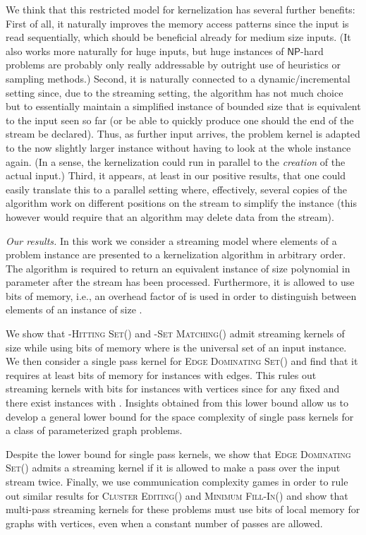\documentclass[draft,a4paper]{llncs}
\newcommand{\NP}{\ensuremath{\mathsf{NP}}\xspace}
\newcommand{\dHSk}{-\textsc{Hitting Set()}\xspace}
\newcommand{\dSMk}{-\textsc{Set Matching()}\xspace}
\newcommand{\EDSk}{\textsc{Edge Dominating Set()}\xspace}
\newcommand{\CEk}{\textsc{Cluster Editing()}\xspace}
\newcommand{\MFIk}{\textsc{Minimum Fill-In()}\xspace}
\begin{document}
We think that this restricted model for kernelization has several further benefits: First of all, it naturally improves the memory access patterns since the input is read sequentially, which should be beneficial already for medium size inputs. (It also works more naturally for huge inputs, but huge instances of \NP-hard problems are probably only really addressable by outright use of heuristics or sampling methods.) Second, it is naturally connected to a dynamic/incremental setting since, due to the streaming setting, the algorithm has not much choice but to essentially maintain a simplified instance of bounded size that is equivalent to the input seen so far (or be able to quickly produce one should the end of the stream be declared). Thus, as further input arrives, the problem kernel is adapted to the now slightly larger instance without having to look at the whole instance again. (In a sense, the kernelization could run in parallel to the \emph{creation} of the 
actual input.) Third, it 
appears, at least in our positive results, that one could easily translate this to a parallel setting where, effectively, several copies of the algorithm work on different positions on the stream to simplify the instance (this however would require that an algorithm may delete data from the stream).

\emph{Our results.}
In this work we consider a streaming model where elements of a problem instance are presented to a kernelization algorithm in arbitrary order. The algorithm is required to return an equivalent instance of size polynomial in parameter  after the stream has been processed. Furthermore, it is allowed to use  bits of memory, i.e., an overhead factor of  is used in order to distinguish between elements of an instance of size .

We show that \dHSk and \dSMk admit streaming kernels of size  while using  bits of memory where  is the universal set of an input instance. We then consider a single pass kernel for \EDSk and find that it requires at least  bits of memory for instances with  edges. This rules out streaming kernels with  bits for instances with  vertices since for any fixed  and  there exist instances with . Insights obtained from this lower bound allow us to develop a general lower bound for the space complexity of single pass kernels for a class of parameterized graph problems. 

Despite the lower bound for single pass kernels, we show that \EDSk admits a streaming kernel if it is allowed to make a pass over the input stream twice. Finally, we use communication complexity games in order to rule out similar results for \CEk and \MFIk and show that multi-pass streaming kernels for these problems must use  bits of local memory for graphs with  vertices, even when a constant number of passes are allowed. 
\end{document}
